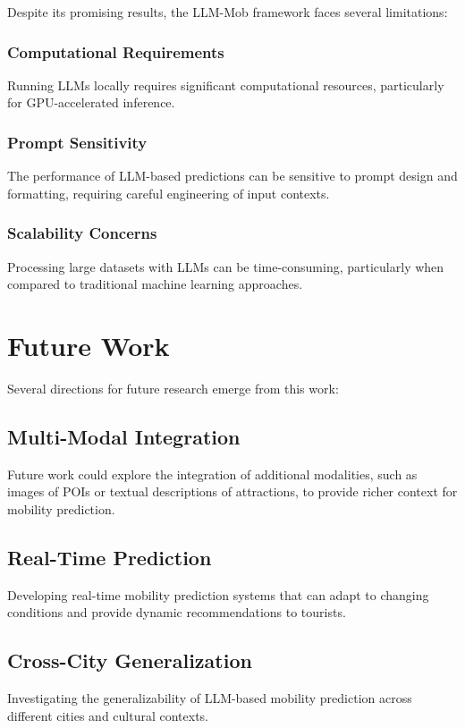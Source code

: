 \documentclass[12pt,a4paper]{article}
\begin{document}
Despite its promising results, the LLM-Mob framework faces several limitations:

\subsubsection{Computational Requirements}
Running LLMs locally requires significant computational resources, particularly for GPU-accelerated inference.

\subsubsection{Prompt Sensitivity}
The performance of LLM-based predictions can be sensitive to prompt design and formatting, requiring careful engineering of input contexts.

\subsubsection{Scalability Concerns}
Processing large datasets with LLMs can be time-consuming, particularly when compared to traditional machine learning approaches.

\section{Future Work}

Several directions for future research emerge from this work:

\subsection{Multi-Modal Integration}
Future work could explore the integration of additional modalities, such as images of POIs or textual descriptions of attractions, to provide richer context for mobility prediction.

\subsection{Real-Time Prediction}
Developing real-time mobility prediction systems that can adapt to changing conditions and provide dynamic recommendations to tourists.

\subsection{Cross-City Generalization}
Investigating the generalizability of LLM-based mobility prediction across different cities and cultural contexts.
\end{document}
